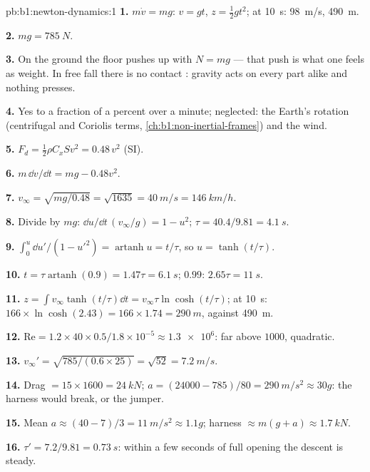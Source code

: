 \begin{solution}{pb:b1:newton-dynamics:1}
\textbf{1.} $m\dot v = mg$: $v = gt$, $z = \tfrac12 gt^2$; at \qty{10}{s}:
\qty{98}{m/s}, \qty{490}{m}.

\textbf{2.} $mg = \qty{785}{N}$.

\textbf{3.} On the ground the floor pushes up with $N = mg$ --- that push
is what one feels as weight. In free fall there is no contact :
gravity acts on every part alike and nothing presses.

\textbf{4.} Yes to a fraction of a percent over a minute; neglected:
the Earth's rotation (centrifugal and Coriolis terms,
\cref{ch:b1:non-inertial-frames}) and the wind.

\textbf{5.} $F_d = \tfrac12\rho C_xSv^2 = 0.48\,v^2$ (SI).

\textbf{6.} $m\,\dd v/\dd t = mg - 0.48v^2$.

\textbf{7.} $v_\infty = \sqrt{mg/0.48} = \sqrt{1635} = \qty{40}{m/s} =
\qty{146}{km/h}$.

\textbf{8.} Divide by $mg$: $\dd u/\dd t\,(v_\infty/g) = 1 - u^2$;
$\tau = 40.4/9.81 = \qty{4.1}{s}$.

\textbf{9.} $\int_0^u\dd u'/(1 - u'^2) = \operatorname{artanh}u = t/\tau$,
so $u = \tanh(t/\tau)$.

\textbf{10.} $t = \tau\operatorname{artanh}(0.9) = 1.47\tau = \qty{6.1}{s}$;
$0.99$: $2.65\tau = \qty{11}{s}$.

\textbf{11.} $z = \int v_\infty\tanh(t/\tau)\dd t = v_\infty\tau\ln\cosh(t/\tau)$;
at \qty{10}{s}: $166 \times \ln\cosh(2.43) = 166 \times 1.74 = \qty{290}{m}$,
against \qty{490}{m}.

\textbf{12.} $\mathrm{Re} = 1.2 \times 40 \times 0.5/1.8\times10^{-5} \approx
\num{1.3e6}$: far above $1000$, quadratic.

\textbf{13.} $v_\infty' = \sqrt{785/(0.6 \times 25)} = \sqrt{52} = \qty{7.2}{m/s}$.

\textbf{14.} Drag $= 15 \times 1600 = \qty{24}{kN}$; $a = (24000 - 785)/80
= \qty{290}{m/s^2} \approx 30g$: the harness would break, or the jumper.

\textbf{15.} Mean $a \approx (40 - 7)/3 = \qty{11}{m/s^2} \approx 1.1g$;
harness  $\approx m(g + a) \approx \qty{1.7}{kN}$.

\textbf{16.} $\tau' = 7.2/9.81 = \qty{0.73}{s}$: within a few seconds of
full opening the descent is steady.


\end{solution}
